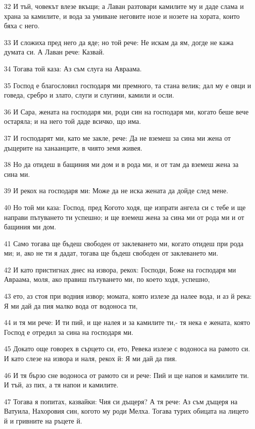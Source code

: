 \par 32 И тъй, човекът влезе вкъщи; а Лаван разтовари камилите му и даде слама и храна за камилите, и вода за умиване неговите нозе и нозете на хората, които бяха с него.
\par 33 И сложиха пред него да яде; но той рече: Не искам да ям, догде не кажа думата си. А Лаван рече: Казвай.
\par 34 Тогава той каза: Аз съм слуга на Авраама.
\par 35 Господ е благословил господаря ми премного, та стана велик; дал му е овци и говеда, сребро и злато, слуги и слугини, камили и осли.
\par 36 И Сара, жената на господаря ми, роди син на господаря ми, когато беше вече остаряла; и на него той даде всичко, що има.
\par 37 И господарят ми, като ме закле, рече: Да не вземеш за сина ми жена от дъщерите на ханаанците, в чиято земя живея.
\par 38 Но да отидеш в бащиния ми дом и в рода ми, и от там да вземеш жена за сина ми.
\par 39 И рекох на господаря ми: Може да не иска жената да дойде след мене.
\par 40 Но той ми каза: Господ, пред Когото ходя, ще изпрати ангела си с тебе и ще направи пътуването ти успешно; и ще вземеш жена за сина ми от рода ми и от бащиния ми дом.
\par 41 Само тогава ще бъдеш свободен от заклеването ми, когато отидеш при рода ми; и, ако не ти я дадат, тогава ще бъдеш свободен от заклеването ми.
\par 42 И като пристигнах днес на извора, рекох: Господи, Боже на господаря ми Авраама, моля, ако правиш пътуването ми, по което ходя, успешно,
\par 43 ето, аз стоя при водния извор; момата, която излезе да налее вода, и аз й река: Я ми дай да пия малко вода от водоноса ти,
\par 44 и тя ми рече: И ти пий, и ще налея и за камилите ти,- тя нека е жената, която Господ е отредил за сина на господаря ми.
\par 45 Докато още говорех в сърцето си, ето, Ревека излезе с водоноса на рамото си. И като слезе на извора и наля, рекох й: Я ми дай да пия.
\par 46 И тя бързо сне водоноса от рамото си и рече: Пий и ще напоя и камилите ти. И тъй, аз пих, а тя напои и камилите.
\par 47 Тогава я попитах, казвайки: Чия си дъщеря? А тя рече: Аз съм дъщеря на Ватуила, Нахоровия син, когото му роди Мелха. Тогава турих обицата на лицето й и гривните на ръцете й.

